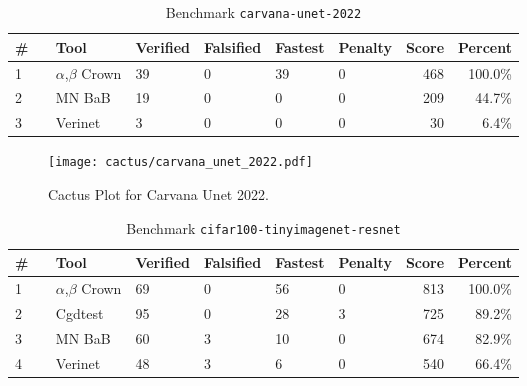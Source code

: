

\begin{table}[h]
\begin{center}
\caption{Benchmark \texttt{carvana-unet-2022}} \label{tab:cat_{cat}}
{\setlength{\tabcolsep}{2pt}
\begin{tabular}[h]{@{}llllllrr@{}}
\toprule
\textbf{\# ~} & \textbf{Tool} & \textbf{Verified} & \textbf{Falsified} & \textbf{Fastest} & \textbf{Penalty} & \textbf{Score} & \textbf{Percent}\\
\midrule
1 & $\alpha$,$\beta$ Crown & 39 & 0 & 39 & 0 & 468 & 100.0\% \\
2 & MN BaB & 19 & 0 & 0 & 0 & 209 & 44.7\% \\
3 & Verinet & 3 & 0 & 0 & 0 & 30 & 6.4\% \\
\bottomrule
\end{tabular}
}
\end{center}
\end{table}



\begin{figure}[h]
\centerline{\texttt{[image: cactus/carvana\_unet\_2022.pdf]}}
\caption{Cactus Plot for Carvana Unet 2022.}
\label{fig:quantPic}
\end{figure}



\begin{table}[h]
\begin{center}
\caption{Benchmark \texttt{cifar100-tinyimagenet-resnet}} \label{tab:cat_{cat}}
{\setlength{\tabcolsep}{2pt}
\begin{tabular}[h]{@{}llllllrr@{}}
\toprule
\textbf{\# ~} & \textbf{Tool} & \textbf{Verified} & \textbf{Falsified} & \textbf{Fastest} & \textbf{Penalty} & \textbf{Score} & \textbf{Percent}\\
\midrule
1 & $\alpha$,$\beta$ Crown & 69 & 0 & 56 & 0 & 813 & 100.0\% \\
2 & Cgdtest & 95 & 0 & 28 & 3 & 725 & 89.2\% \\
3 & MN BaB & 60 & 3 & 10 & 0 & 674 & 82.9\% \\
4 & Verinet & 48 & 3 & 6 & 0 & 540 & 66.4\% \\
\bottomrule
\end{tabular}
}
\end{center}
\end{table}



